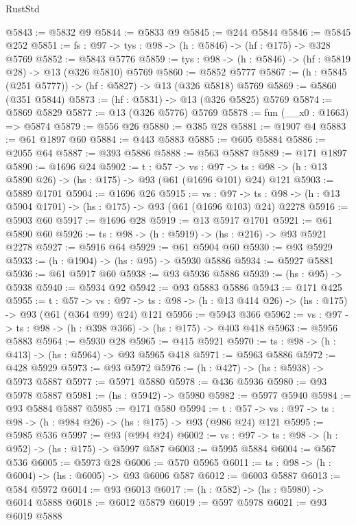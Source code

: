 \begin{lexlean}{RustStd}
\begin{coremodule}
@5843 := @5832 @9
@5844 := @5833 @9
@5845 := @244 @5844
@5846 := @5845 @252
@5851 := {fs : @97} -> {tys : @98} -> (h : @5846) -> (hf : @175) -> @328 @5769
@5852 := @5843 @5776
@5859 := {tys : @98} -> (h : @5846) -> (hf : @5819 @28) -> @13 (@326 @5810) @5769
@5860 := @5852 @5777
@5867 := (h : @5845 (@251 @5777)) -> (hf : @5827) -> @13 (@326 @5818) @5769
@5869 := @5860 (@351 @5844)
@5873 := (hf : @5831) -> @13 (@326 @5825) @5769
@5874 := @5869 @5829
@5877 := @13 (@326 @5776) @5769
@5878 := fun (__x0 : @1663) => @5874
@5879 := @556 @26
@5880 := @385 @28
@5881 := @1907 @4
@5883 := @61 @1897 @60
@5884 := @443 @5883
@5885 := @605 @5884
@5886 := @2055 @64
@5887 := @393 @5886
@5888 := @563 @5887
@5889 := @171 @1897
@5890 := @1696 @24
@5902 := {t : @57} ->
  {vs : @97} -> {ts : @98} -> (h : @13 @5890 @26) -> (hs : @175) -> @93 (@61 (@1696 @101) @24) @121
@5903 := @5889 @1701
@5904 := @1696 @26
@5915 := {vs : @97} ->
  {ts : @98} -> (h : @13 @5904 @1701) -> (hs : @175) -> @93 (@61 (@1696 @103) @24) @2278
@5916 := @5903 @60
@5917 := @1696 @28
@5919 := @13 @5917 @1701
@5921 := @61 @5890 @60
@5926 := {ts : @98} -> (h : @5919) -> (hs : @216) -> @93 @5921 @2278
@5927 := @5916 @64
@5929 := @61 @5904 @60
@5930 := @93 @5929
@5933 := (h : @1904) -> (hs : @95) -> @5930 @5886
@5934 := @5927 @5881
@5936 := @61 @5917 @60
@5938 := @93 @5936 @5886
@5939 := (hs : @95) -> @5938
@5940 := @5934 @92
@5942 := @93 @5883 @5886
@5943 := @171 @425
@5955 := {t : @57} ->
  {vs : @97} -> {ts : @98} -> (h : @13 @414 @26) -> (hs : @175) -> @93 (@61 (@364 @99) @24) @121
@5956 := @5943 @366
@5962 := {vs : @97} -> {ts : @98} -> (h : @398 @366) -> (hs : @175) -> @403 @418
@5963 := @5956 @5883
@5964 := @5930 @28
@5965 := @415 @5921
@5970 := {ts : @98} -> (h : @413) -> (hs : @5964) -> @93 @5965 @418
@5971 := @5963 @5886
@5972 := @428 @5929
@5973 := @93 @5972
@5976 := (h : @427) -> (hs : @5938) -> @5973 @5887
@5977 := @5971 @5880
@5978 := @436 @5936
@5980 := @93 @5978 @5887
@5981 := (hs : @5942) -> @5980
@5982 := @5977 @5940
@5984 := @93 @5884 @5887
@5985 := @171 @580
@5994 := {t : @57} ->
  {vs : @97} -> {ts : @98} -> (h : @984 @26) -> (hs : @175) -> @93 (@986 @24) @121
@5995 := @5985 @536
@5997 := @93 (@994 @24)
@6002 := {vs : @97} -> {ts : @98} -> (h : @952) -> (hs : @175) -> @5997 @587
@6003 := @5995 @5884
@6004 := @567 @536
@6005 := @5973 @28
@6006 := @570 @5965
@6011 := {ts : @98} -> (h : @6004) -> (hs : @6005) -> @93 @6006 @587
@6012 := @6003 @5887
@6013 := @584 @5972
@6014 := @93 @6013
@6017 := (h : @582) -> (hs : @5980) -> @6014 @5888
@6018 := @6012 @5879
@6019 := @597 @5978
@6021 := @93 @6019 @5888

\end{coremodule}
\end{lexlean}
